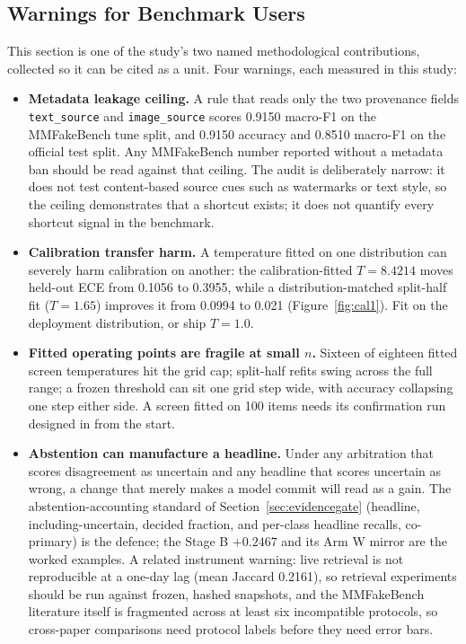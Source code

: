 \documentclass{article} %
\begin{document}
\subsection{Warnings for Benchmark Users}
This section is one of the study's two named methodological contributions, collected so it can be cited as a unit. Four warnings, each measured in this study:

\begin{itemize}
    \item \textbf{Metadata leakage ceiling.} A rule that reads only the two provenance fields \texttt{text\_source} and \texttt{image\_source} scores 0.9150 macro-F1 on the MMFakeBench tune split, and 0.9150 accuracy and 0.8510 macro-F1 on the official test split. Any MMFakeBench number reported without a metadata ban should be read against that ceiling. The audit is deliberately narrow: it does not test content-based source cues such as watermarks or text style, so the ceiling demonstrates that a shortcut exists; it does not quantify every shortcut signal in the benchmark.
    \item \textbf{Calibration transfer harm.} A temperature fitted on one distribution can severely harm calibration on another: the calibration-fitted \(T=8.4214\) moves held-out ECE from 0.1056 to 0.3955, while a distribution-matched split-half fit (\(T=1.65\)) improves it from 0.0994 to 0.021 (Figure~\ref{fig:cal1}). Fit on the deployment distribution, or ship \(T=1.0\).
    \item \textbf{Fitted operating points are fragile at small \(n\).} Sixteen of eighteen fitted screen temperatures hit the grid cap; split-half refits swing across the full range; a frozen threshold can sit one grid step wide, with accuracy collapsing one step either side. A screen fitted on 100 items needs its confirmation run designed in from the start.
    \item \textbf{Abstention can manufacture a headline.} Under any arbitration that scores disagreement as uncertain and any headline that scores uncertain as wrong, a change that merely makes a model commit will read as a gain. The abstention-accounting standard of Section~\ref{sec:evidencegate} (headline, including-uncertain, decided fraction, and per-class headline recalls, co-primary) is the defence; the Stage B \(+0.2467\) and its Arm W mirror are the worked examples. A related instrument warning: live retrieval is not reproducible at a one-day lag (mean Jaccard 0.2161), so retrieval experiments should be run against frozen, hashed snapshots, and the MMFakeBench literature itself is fragmented across at least six incompatible protocols, so cross-paper comparisons need protocol labels before they need error bars.
\end{itemize}
\end{document}
